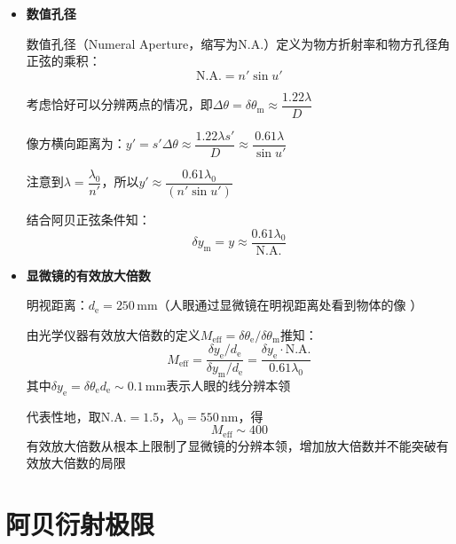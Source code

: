 \documentclass[10pt]{beamer}
\newenvironment{slide}{
    \begin{frame}{\bfseries{\sectiontitle}}
}{
    \end{frame}
}
\let\sectiononly\section
\renewcommand{\section}[1]{
    \sectiononly{#1}
    \let\sectiontitle\relax
    \newcommand{\sectiontitle}{#1}
}
\begin{document}
\begin{slide}
    \begin{itemize}
    \item \textbf{数值孔径}

    数值孔径（Numeral Aperture，缩写为$\mathrm{N.A.}$）定义为物方折射率和物方孔径角正弦的乘积：
    \[
        \boxed{\mathrm{N.A.} = n'\sin u'}
    \]

    考虑恰好可以分辨两点的情况，即$\Delta\theta=\delta\theta_{\mathrm{m}}\approx\dfrac{1.22\lambda}{D}$

    像方横向距离为：$y'=s'\Delta\theta\approx\dfrac{1.22\lambda s'}{D}\approx\dfrac{0.61\lambda}{\sin{u'}}$

    注意到$\lambda=\dfrac{\lambda_0}{n'}$，所以$y'\approx\dfrac{0.61\lambda_0}{(n'\sin{u'})}$

    结合阿贝正弦条件知：
    \[
        \boxed{\delta y_{\mathrm{m}} = y \approx \frac{0.61\lambda_0}{\mathrm{N.A.}}}
    \]
    \end{itemize}
\end{slide}

\begin{slide}
    \begin{itemize}
    \item \textbf{显微镜的有效放大倍数}

    明视距离：$d_{\mathrm{e}} = 250\,\mathrm{mm}$（人眼通过显微镜在明视距离处看到物体的像 ）

    由光学仪器有效放大倍数的定义$M_{\mathrm{eff}}=\delta\theta_{\mathrm{e}}/\delta\theta_{\mathrm{m}}$推知：
    \[
    \boxed{
        M_{\mathrm{eff}}
        = \frac{\delta y_{\mathrm{e}} / d_{\mathrm{e}}}{\delta y_{\mathrm{m}} / d_{\mathrm{e}}}
        = \frac{\delta y_{\mathrm{e}} \cdot \mathrm{N.A.}}{0.61\lambda_0}
    }
    \]
    其中$\delta y_{\mathrm{e}} = \delta\theta_{\mathrm{e}}d_{\mathrm{e}} \sim 0.1\,\mathrm{mm}$表示人眼的线分辨本领

    代表性地，取$\mathrm{N.A.} = 1.5$，$\lambda_0 = 550\,\mathrm{nm}$，得
    \[
        \boxed{M_{\mathrm{eff}} \sim 400}
    \]
    有效放大倍数从根本上限制了显微镜的分辨本领，增加放大倍数并不能突破有效放大倍数的局限
    \end{itemize}
\end{slide}

\section{阿贝衍射极限}
\end{document}

